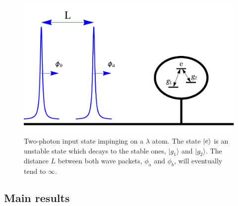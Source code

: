 \documentclass[notitlepage, prx, preprint, amsmath,superscriptaddress,amssymb]{revtex4-1}
\begin{document}
  
\begin{figure}
\includegraphics[scale=0.25]{input.pdf}
\caption{Two-photon input state impinging on a $\lambda$ atom. The state $\ket{e}$ is an unstable state which decays to the stable ones, $|g_1\rangle$ and $|g_2\rangle$. The distance $L$ between both wave packets, $\phi_a$ and $\phi_b$, will eventually tend to $\infty$.}
\label{fig:input}
\end{figure}





\subsection{Main results}
\end{document}
